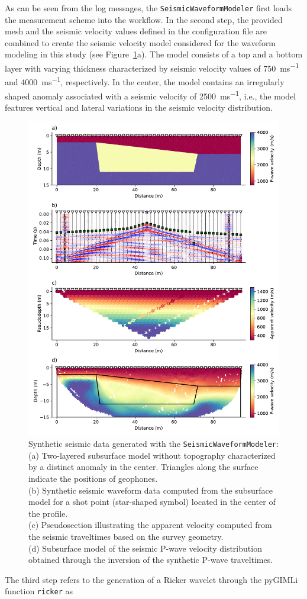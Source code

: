 \documentclass[a4paper,fleqn]{cas-sc}
\begin{document}
As can be seen from the log messages, the \texttt{SeismicWaveformModeler} first loads the measurement scheme into the workflow. In the second step, the provided mesh and the seismic velocity values defined in the configuration file are combined to create the seismic velocity model considered for the waveform modeling in this study (see Figure~\ref{fig:syndataexample}a). The model consists of a top and a bottom layer with varying thickness characterized by seismic velocity values of \qty{750}{ms^{-1}} and \qty{4000}{ms^{-1}}, respectively. In the center, the model contains an irregularly shaped anomaly associated with a seismic velocity of \qty{2500}{ms^{-1}}, i.e., the model features vertical and lateral variations in the seismic velocity distribution.
\begin{figure}
	\centering
	\includegraphics[width=.75\textwidth]{figures/synthetic_data_example.pdf}
	\caption{Synthetic seismic data generated with the \texttt{SeismicWaveformModeler}: \\(a) Two-layered subsurface model without topography characterized by a distinct anomaly in the center. Triangles along the surface indicate the positions of geophones. \\(b) Synthetic seismic waveform data computed from the subsurface model for a shot point (star-shaped symbol) located in the center of the profile. \\(c) Pseudosection illustrating the apparent velocity computed from the seismic traveltimes based on the survey geometry. \\(d) Subsurface model of the seismic P-wave velocity distribution obtained through the inversion of the synthetic P-wave traveltimes.}
	\label{fig:syndataexample}
\end{figure}
The third step refers to the generation of a Ricker wavelet through the pyGIMLi function \texttt{ricker} as
\end{document}
